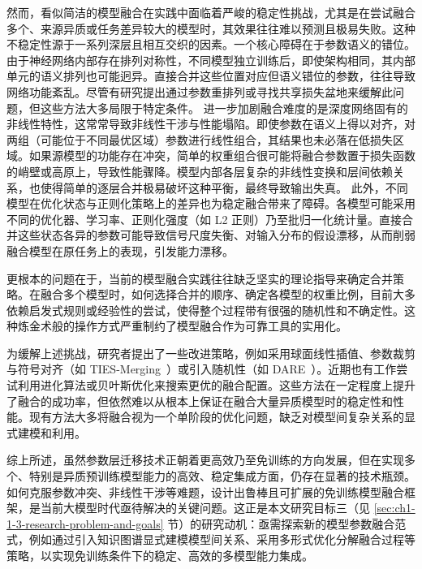 \documentclass[../main.tex]{subfiles}
\begin{document}
然而，看似简洁的模型融合在实践中面临着严峻的稳定性挑战，尤其是在尝试融合多个、来源异质或任务差异较大的模型时，其效果往往难以预测且极易失败。这种不稳定性源于一系列深层且相互交织的因素。一个核心障碍在于参数语义的错位\cite{gitrebasin_ainsworth_2023}。由于神经网络内部存在排列对称性，不同模型独立训练后，即使架构相同，其内部单元的语义排列也可能迥异。直接合并这些位置对应但语义错位的参数，往往导致网络功能紊乱。尽管有研究提出通过参数重排列或寻找共享损失盆地来缓解此问题，但这些方法大多局限于特定条件。
进一步加剧融合难度的是深度网络固有的非线性特性，这常常导致非线性干涉与性能塌陷\cite{losssurfacesmode_garipov_2018,averagingweightsleads_izmailov_2018}。即使参数在语义上得以对齐，对两组（可能位于不同最优区域）参数进行线性组合，其结果也未必落在低损失区域。如果源模型的功能存在冲突，简单的权重组合很可能将融合参数置于损失函数的峭壁或高原上，导致性能骤降。模型内部各层复杂的非线性变换和层间依赖关系，也使得简单的逐层合并极易破坏这种平衡，最终导致输出失真。
此外，不同模型在优化状态与正则化策略上的差异也为稳定融合带来了障碍。各模型可能采用不同的优化器、学习率、正则化强度（如 L2 正则）乃至批归一化统计量。直接合并这些状态各异的参数可能导致信号尺度失衡、对输入分布的假设漂移，从而削弱融合模型在原任务上的表现，引发能力漂移。

更根本的问题在于，当前的模型融合实践往往缺乏坚实的理论指导来确定合并策略。在融合多个模型时，如何选择合并的顺序、确定各模型的权重比例，目前大多依赖启发式规则或经验性的尝试，使得整个过程带有很强的随机性和不确定性。这种炼金术般的操作方式严重制约了模型融合作为可靠工具的实用化。

为缓解上述挑战，研究者提出了一些改进策略，例如采用球面线性插值、参数裁剪与符号对齐（如 TIES-Merging~\cite{tiesmergingresolving_yadav_2023}）或引入随机性（如 DARE~\cite{languagemodelsare_yu_2024}）。近期也有工作尝试利用进化算法或贝叶斯优化来搜索更优的融合配置\cite{evolutionaryoptimizationmodel_akiba_2025}。这些方法在一定程度上提升了融合的成功率，但依然难以从根本上保证在融合大量异质模型时的稳定性和性能。现有方法大多将融合视为一个单阶段的优化问题，缺乏对模型间复杂关系的显式建模和利用。

综上所述，虽然参数层迁移技术正朝着更高效乃至免训练的方向发展，但在实现多个、特别是异质预训练模型能力的高效、稳定集成方面，仍存在显著的技术瓶颈。如何克服参数冲突、非线性干涉等难题，设计出鲁棒且可扩展的免训练模型融合框架，是当前大模型时代亟待解决的关键问题。这正是本文研究目标三（见 \ref{sec:ch1-1-3-research-problem-and-goals} 节）的研究动机：亟需探索新的模型参数融合范式，例如通过引入知识图谱显式建模模型间关系、采用多形式优化分解融合过程等策略，以实现免训练条件下的稳定、高效的多模型能力集成。
\end{document}
